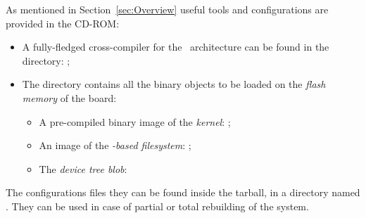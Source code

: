As mentioned in Section~\ref{sec:Overview} useful tools and configurations
are provided in the CD-ROM:
\begin{itemize}
\item   A fully-fledged cross-compiler for the \PPC\ architecture
        can be found in the  directory:
        ;

\item   The  directory contains all the binary
        objects to be loaded on the \emph{flash memory} of the
        board:
        \begin{itemize}
        \item   A pre-compiled binary image of the \emph{kernel}:
                ;
        \item   An image of the \emph{\BusyBox-based filesystem}:
                ;
        \item   The \emph{device tree blob}:
        \end{itemize}
\end{itemize}

The configurations files they can be found inside the
 tarball, in a directory named .
They can be used in case of partial or total rebuilding of the system.



